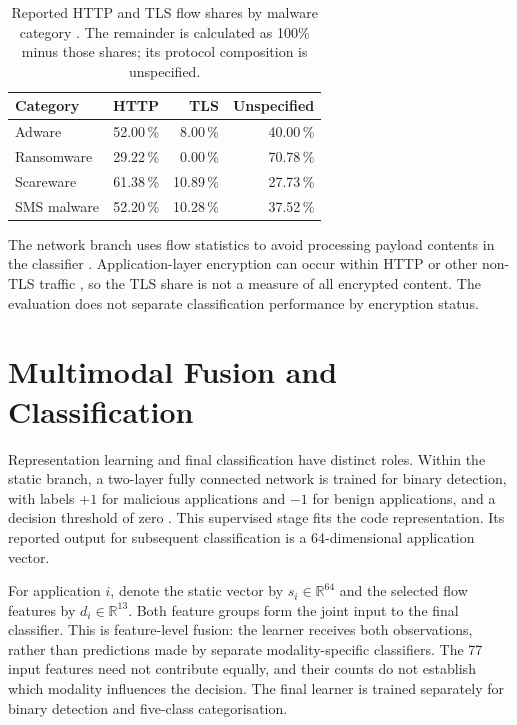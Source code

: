 \begin{table}
  \caption{Reported HTTP and TLS flow shares by malware category
  \cite{norouzian2021hybroid}. The remainder is calculated as 100\% minus those shares;
  its protocol composition is unspecified.}
  \label{tab:hybroid:protocols}
  \centering
  \begin{tabular}{lrrr}
    \toprule
    Category & HTTP & TLS & Unspecified \\
    \midrule
    Adware      & 52.00\,\% &  8.00\,\% & 40.00\,\% \\
    Ransomware  & 29.22\,\% &  0.00\,\% & 70.78\,\% \\
    Scareware   & 61.38\,\% & 10.89\,\% & 27.73\,\% \\
    SMS malware & 52.20\,\% & 10.28\,\% & 37.52\,\% \\
    \bottomrule
  \end{tabular}
\end{table}

The network branch uses flow statistics to avoid processing payload contents in the classifier
\cite{norouzian2021hybroid}.
Application-layer encryption can occur within HTTP or other non-TLS traffic
\cite{pourali2022hidden}, so the TLS share is not a measure of all encrypted content.
The evaluation does not separate classification performance by encryption status.

\section{Multimodal Fusion and Classification}
\label{sec:hybroid:8}

Representation learning and final classification have distinct roles. Within the static branch,
a two-layer fully connected network is trained for binary detection, with labels $+1$ for
malicious applications and $-1$ for benign applications, and a decision threshold of zero
\cite{norouzian2021hybroid}. This supervised stage fits the code representation. Its reported
output for subsequent classification is a 64-dimensional application vector.

For application $i$, denote the static vector by $s_i\in\mathbb R^{64}$ and the selected
flow features by $d_i\in\mathbb R^{13}$. Both feature groups form the joint input to the final
classifier. This is feature-level fusion: the learner receives both observations, rather than
predictions made by separate modality-specific classifiers. The 77 input features need not
contribute equally, and their counts do not establish which modality influences the decision.
The final learner is trained separately for binary detection and five-class categorisation.

